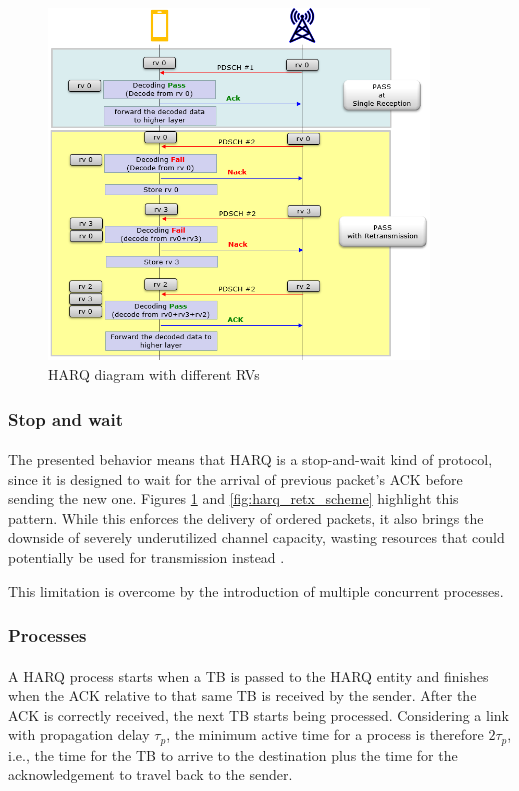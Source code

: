 \begin{figure}[ht]
    \centering
    \includegraphics[width=0.9\textwidth]{res/harq-retx-scheme-2.png}
    \caption{\ac{HARQ} diagram with different RVs\cite{5g-nr-harq-sharetechnote}}
    \label{fig:harq_retx_scheme_2}
\end{figure}


\subsubsection{Stop and wait}
\paragraph{} The presented behavior means that \ac{HARQ} is a stop-and-wait kind of protocol, since it is designed to wait for the arrival of previous packet's \ac{ACK} before sending the new one. Figures \ref{fig:harq_retx_scheme_2} and \ref{fig:harq_retx_scheme} highlight this pattern. While this enforces the delivery of ordered packets, it also brings the downside of severely underutilized channel capacity, wasting resources that could potentially be used for transmission instead \cite{3gpp-ts-38.214}. 

This limitation is overcome by the introduction of multiple concurrent processes.

\subsubsection{Processes}
\paragraph{}
A \ac{HARQ} process starts when a \ac{TB} is passed to the \ac{HARQ} entity and finishes when the \ac{ACK} relative to that same \ac{TB} is received by the sender. After the \ac{ACK} is correctly received, the next \ac{TB} starts being processed. Considering a link with propagation delay $\tau_p$, the minimum active time for a process is therefore $2\tau_p$, i.e., the time for the \ac{TB} to arrive to the destination plus the time for the acknowledgement to travel back to the sender.

